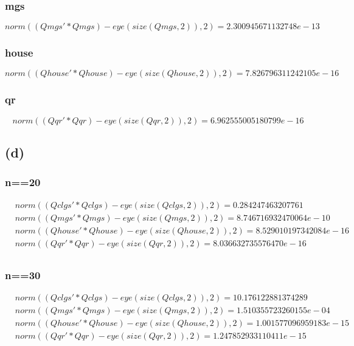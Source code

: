 \documentclass{article}
\begin{document}
            \subsubsection*{mgs}
                \[
                    norm((Qmgs'*Qmgs)-eye(size(Qmgs,2)),2) = 2.300945671132748e-13    
                \]
            \subsubsection*{house}
                \[
                    norm((Qhouse'*Qhouse)-eye(size(Qhouse,2)),2) = 7.826796311242105e-16    
                \]
            \subsubsection*{qr}
                \[
                    norm((Qqr'*Qqr)-eye(size(Qqr,2)),2) = 6.962555005180799e-16    
                \]
        \subsection*{(d)}
            \subsubsection*{n==20}
                \begin{equation*}
                    \begin{aligned}
                        &norm((Qclgs'*Qclgs)-eye(size(Qclgs,2)),2) = 0.284247463207761\\    
                        &norm((Qmgs'*Qmgs)-eye(size(Qmgs,2)),2) = 8.746716932470064e-10\\
                        &norm((Qhouse'*Qhouse)-eye(size(Qhouse,2)),2) = 8.529010197342084e-16\\
                        &norm((Qqr'*Qqr)-eye(size(Qqr,2)),2) = 8.036632735576470e-16\\    
                    \end{aligned}
                \end{equation*}
            \subsubsection*{n==30}
                \begin{equation*}
                    \begin{aligned}
                        &norm((Qclgs'*Qclgs)-eye(size(Qclgs,2)),2) = 10.176122881374289\\    
                        &norm((Qmgs'*Qmgs)-eye(size(Qmgs,2)),2) = 1.510355723260155e-04\\
                        &norm((Qhouse'*Qhouse)-eye(size(Qhouse,2)),2) = 1.001577096959183e-15\\
                        &norm((Qqr'*Qqr)-eye(size(Qqr,2)),2) = 1.247852933110411e-15\\    
                    \end{aligned}
                \end{equation*}
\end{document}

